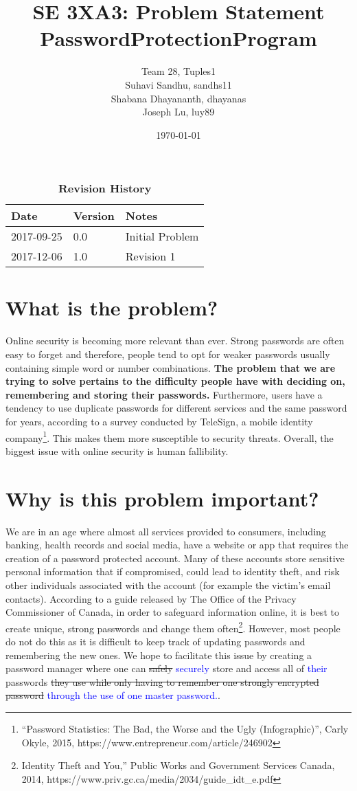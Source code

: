 \documentclass{article}
\title{SE 3XA3: Problem Statement\\PasswordProtectionProgram}
\author{Team 28, Tuples1
		\\ Suhavi Sandhu, sandhs11
		\\ Shabana Dhayananth, dhayanas
		\\ Joseph Lu, luy89
}
\date{\today}
\begin{document}
\begin{table}[bp]
\caption{\bf Revision History} \label{TblRevisionHistory}
\begin{tabularx}{\textwidth}{p{3cm}p{2cm}X}
\toprule {\bf Date} & {\bf Version} & {\bf Notes}\\
\midrule
2017-09-25 & 0.0 & Initial Problem\\
2017-12-06 & 1.0 & Revision 1\\
\bottomrule
\end{tabularx}
\end{table}

\newpage

\maketitle

\section*{What is the problem?}
Online security is becoming more relevant than ever. Strong passwords are often easy to forget and therefore, people tend to opt for weaker passwords usually containing simple word or number combinations. \textbf{The problem that we are trying to solve pertains to the difficulty people have with deciding on, remembering and storing their passwords.} Furthermore, users have a tendency to use duplicate passwords for different services and the same password for years, according to a survey conducted by TeleSign, a mobile identity company\footnote{“Password Statistics: The Bad, the Worse and the Ugly (Infographic)”, Carly Okyle, 2015, https://www.entrepreneur.com/article/246902}. This makes them more susceptible to security threats. Overall, the biggest issue with online security is human fallibility.

\section*{Why is this problem important?}
We are in an age where almost all services provided to consumers, including banking, health records and social media, have a website or app that requires the creation of a password protected account. Many of these accounts store sensitive personal information that if compromised, could lead to identity theft, and risk other individuals associated with the account (for example the victim’s email contacts). According to a guide released by The Office of the Privacy Commissioner of Canada, in order to safeguard information online, it is best to create unique, strong passwords and change them often\footnote{Identity Theft and You,” Public Works and Government Services Canada, 2014,  https://www.priv.gc.ca/media/2034/guide\_idt\_e.pdf}. However, most people do not do this as it is difficult to keep track of updating passwords and remembering the new ones. We hope to facilitate this issue by creating a password manager where one can \sout{safely} \textcolor{blue}{securely} store and access all of \textcolor{blue}{their} passwords \sout{they use while only having to remember one strongly encrypted password} \textcolor{blue}{through the use of one master password.}.
\end{document}
